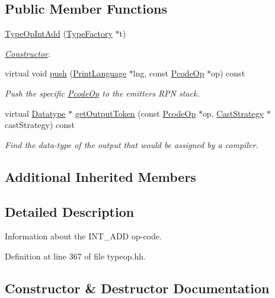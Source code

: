 \subsection*{Public Member Functions}
\begin{DoxyCompactItemize}
\item 
\mbox{\hyperlink{class_type_op_int_add_a682a920f276915c8cbc62633cf81f86a}{Type\+Op\+Int\+Add}} (\mbox{\hyperlink{class_type_factory}{Type\+Factory}} $\ast$t)
\begin{DoxyCompactList}\small\item\em \mbox{\hyperlink{class_constructor}{Constructor}}. \end{DoxyCompactList}\item 
virtual void \mbox{\hyperlink{class_type_op_int_add_aef08e55caf43842a91d116ba2174091e}{push}} (\mbox{\hyperlink{class_print_language}{Print\+Language}} $\ast$lng, const \mbox{\hyperlink{class_pcode_op}{Pcode\+Op}} $\ast$op) const
\begin{DoxyCompactList}\small\item\em Push the specific \mbox{\hyperlink{class_pcode_op}{Pcode\+Op}} to the emitter\textquotesingle{}s R\+PN stack. \end{DoxyCompactList}\item 
virtual \mbox{\hyperlink{class_datatype}{Datatype}} $\ast$ \mbox{\hyperlink{class_type_op_int_add_aae4df67ef6e65039c3a05cea8bdef6c4}{get\+Output\+Token}} (const \mbox{\hyperlink{class_pcode_op}{Pcode\+Op}} $\ast$op, \mbox{\hyperlink{class_cast_strategy}{Cast\+Strategy}} $\ast$cast\+Strategy) const
\begin{DoxyCompactList}\small\item\em Find the data-\/type of the output that would be assigned by a compiler. \end{DoxyCompactList}\end{DoxyCompactItemize}
\subsection*{Additional Inherited Members}


\subsection{Detailed Description}
Information about the I\+N\+T\+\_\+\+A\+DD op-\/code. 

Definition at line 367 of file typeop.\+hh.



\subsection{Constructor \& Destructor Documentation}
\mbox{\label{class_type_op_int_add_a682a920f276915c8cbc62633cf81f86a}} 
